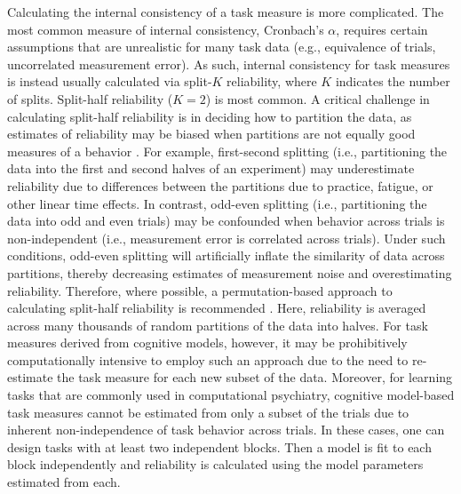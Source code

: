 \documentclass[a4paper,12pt]{article}
\begin{document}
Calculating the internal consistency of a task measure is more complicated. The most common measure of internal consistency, Cronbach's $\alpha$, requires certain assumptions that are unrealistic for many task data (e.g., equivalence of trials, uncorrelated measurement error). As such, internal consistency for task measures is instead usually calculated via split-$K$ reliability, where $K$ indicates the number of splits. Split-half reliability ($K=2$) is most common. A critical challenge in calculating split-half reliability is in deciding how to partition the data, as estimates of reliability may be biased when partitions are not equally good measures of a behavior \cite{Green2016-xw, pronk2022can}. For example, first-second splitting (i.e., partitioning the data into the first and second halves of an experiment) may underestimate reliability due to differences between the partitions due to practice, fatigue, or other linear time effects. In contrast, odd-even splitting (i.e., partitioning the data into odd and even trials) may be confounded when behavior across trials is non-independent (i.e., measurement error is correlated across trials). Under such conditions, odd-even splitting will artificially inflate the similarity of data across partitions, thereby decreasing estimates of measurement noise and overestimating reliability. Therefore, where possible, a permutation-based approach to calculating split-half reliability is recommended \cite{pronk2022can, Parsons2019-jw}. Here, reliability is averaged across many thousands of random partitions of the data into halves. For task measures derived from cognitive models, however, it may be prohibitively computationally intensive to employ such an approach due to the need to re-estimate the task measure for each new subset of the data. Moreover, for learning tasks that are commonly used in computational psychiatry, cognitive model-based task measures cannot be estimated from only a subset of the trials due to inherent non-independence of task behavior across trials. In these cases, one can design tasks with at least two independent blocks. Then a model is fit to each block independently and reliability is calculated using the model parameters estimated from each. 
\end{document}
